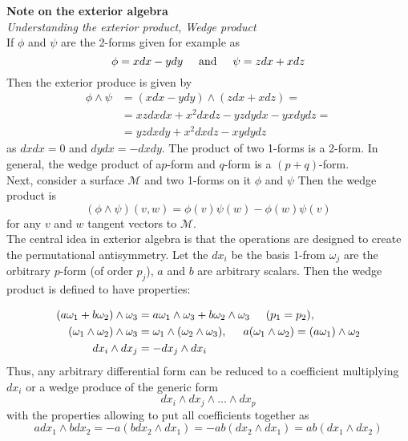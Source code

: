 \documentclass[11pt,a4paper,headinclude=true,DIV=14,BCOR=8mm,chapterprefix,listof=totoc,twoside,openright,abstracton]{scrbook}
\begin{document}
\begin{sidenote}
    \textbf{Note on the exterior algebra} \\
    \textit{Understanding the exterior product, Wedge product} \\
    If $\phi$ and $\psi$ are the 2-forms given for example as 
    \begin{equation}
        \phi = x dx - y dy \hspace{5mm} \text{and} \hspace{5mm}\psi = z dx + x dz
    \end{equation}
    Then the exterior produce is given by 
    \begin{align}
        \phi\wedge\psi &= (x dx - y dy)\wedge(zdx + xdz) = \\
        &=xzdxdx+x^2dxdz-yzdydx-yxdydz= \\
        &=yzdxdy + x^2 dx dz - xydydz
    \end{align}
    as $dxdx=0$ and $dydx=-dxdy$. The product of two 1-forms is a 2-form.
    In general, the wedge product of a$p$-form and $q$-form is a $(p+q)$-form. \\
    
    Next, consider a surface $\mathcal{M}$ and two 1-forms on it $\phi$ and $\psi$ Then the wedge product is 
    \begin{equation}
        (\phi\wedge\psi)(v,w)=\phi(v)\psi(w) - \phi(w)\psi(v)
    \end{equation}
    for any $v$ and $w$ tangent vectors to $\mathcal{M}$. \\
    
    The central idea in exterior algebra is that the operations are designed to create the permutational antisymmetry. Let the $dx_i$ be the basis 1-from $\omega_j$ are the orbitrary $p$-form (of order $p_j$), $a$ and $b$ are arbitrary scalars. Then the wedge product is defined to have properties:
    
    \begin{align}
        (a\omega_1+b\omega_2)\wedge\omega_3 &= a\omega_1\wedge\omega_3+b\omega_2\wedge\omega_3 \hspace{5mm} (p_1 = p_2), \\
        (\omega_1\wedge\omega_2)\wedge\omega_3 &= \omega_1\wedge(\omega_2\wedge\omega_3), \hspace{5mm} a(\omega_1\wedge\omega_2) =  (a\omega_1)\wedge\omega_2\\
        dx_i\wedge dx_j &= -dx_j\wedge dx_i
    \end{align}
    Thus, any arbitrary differential form can be reduced to a coefficient multiplying $dx_i$ or a wedge produce of the generic form 
    \begin{equation}
        dx_i\wedge dx_j \wedge...\wedge dx_p
    \end{equation}
    with the properties allowing to put all coefficients together as 
    \begin{equation}
        a dx_1 \wedge b dx_2 = - a(b dx_2 \wedge dx_1) = -ab(dx_2 \wedge dx_1) = ab(dx_1 \wedge dx_2)
    \end{equation}
    

\end{sidenote}
\end{document}
